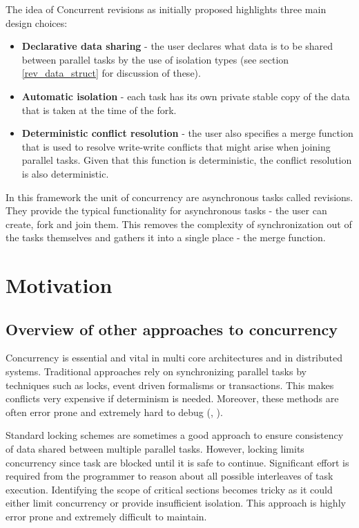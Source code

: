\documentclass[12pt,twoside,notitlepage]{report}
\begin{document}
The idea of Concurrent revisions as initially proposed highlights three main design choices:
\begin{itemize}
\item {\bfseries Declarative data sharing} - the user declares what data is to be shared between parallel tasks by the use of isolation types (see section \ref{rev_data_struct} for discussion of these).  
 
\item {\bfseries Automatic isolation} - each task has its own private stable copy of the data that is taken at the time of the fork.

\item {\bfseries Deterministic conflict resolution} - the user also specifies a merge function that is used to resolve write-write conflicts that might arise when joining parallel tasks. Given that this function is deterministic, the conflict resolution is also deterministic.

\end{itemize}

In this framework the unit of concurrency are asynchronous tasks called revisions. They provide the typical functionality for asynchronous tasks - the user can create, fork and join them. This removes the complexity of synchronization out of the tasks themselves and gathers it into a single place - the merge function. 

\section{Motivation}

\subsection{Overview of other approaches to concurrency}
 
Concurrency is essential and vital in multi core architectures and in distributed systems. Traditional approaches rely on synchronizing parallel tasks by techniques such as locks, event driven formalisms or transactions. This makes conflicts very expensive if determinism is needed. Moreover, these methods are often error prone and extremely hard to debug (\cite{bacon}, \cite{transactions}).

Standard locking schemes are sometimes a good approach to ensure consistency of data shared between multiple parallel tasks. However, locking limits concurrency since task are blocked until it is safe to continue. Significant effort is required from the programmer to reason about all possible interleaves of task execution. Identifying the scope of critical sections becomes tricky as it could either limit concurrency or provide insufficient isolation. This approach is highly error prone and extremely difficult to maintain.
\end{document}

